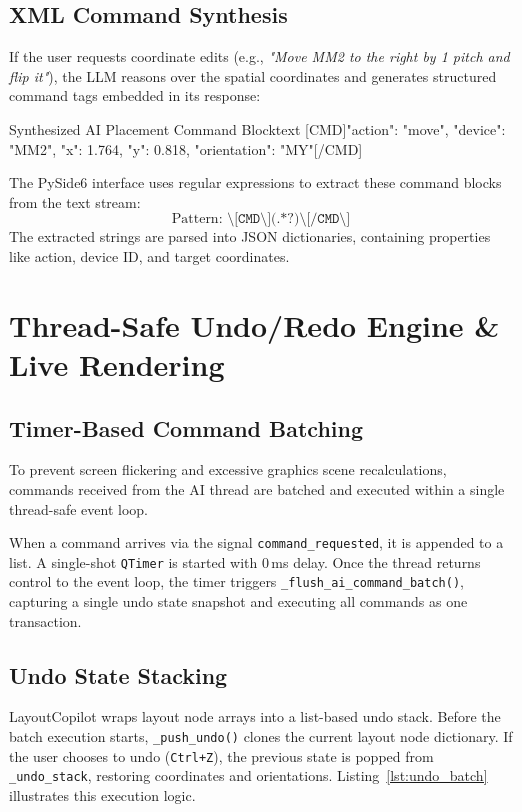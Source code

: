 \subsection{XML Command Synthesis}
If the user requests coordinate edits (e.g., \emph{"Move MM2 to the right by 1 pitch and flip it"}), the LLM reasons over the spatial coordinates and generates structured command tags embedded in its response:
\begin{thesiscode}{Synthesized AI Placement Command Block}{text}
[CMD]{"action": "move", "device": "MM2", "x": 1.764, "y": 0.818, "orientation": "MY"}[/CMD]
\end{thesiscode}

The PySide6 interface uses regular expressions to extract these command blocks from the text stream:
\begin{equation}
    \text{Pattern: } \texttt{\textbackslash[CMD\textbackslash](.*?)\textbackslash[/CMD\textbackslash]}
\end{equation}
The extracted strings are parsed into JSON dictionaries, containing properties like action, device ID, and target coordinates.

\section[Undo Stack \& Live Rendering]{Thread-Safe Undo/Redo Engine \& Live Rendering}
\label{sec:undo_klayout}

\subsection{Timer-Based Command Batching}
To prevent screen flickering and excessive graphics scene recalculations, commands received from the AI thread are batched and executed within a single thread-safe event loop. 

When a command arrives via the signal \texttt{command\_requested}, it is appended to a list. A single-shot \texttt{QTimer} is started with $0$\,ms delay. Once the thread returns control to the event loop, the timer triggers \texttt{\_flush\_}\allowbreak\texttt{ai\_}\allowbreak\texttt{command\_}\allowbreak\texttt{batch()}, capturing a single undo state snapshot and executing all commands as one transaction.

\subsection{Undo State Stacking}
LayoutCopilot wraps layout node arrays into a list-based undo stack. Before the batch execution starts, \texttt{\_push\_}\allowbreak\texttt{undo()} clones the current layout node dictionary. If the user chooses to undo (\texttt{Ctrl+Z}), the previous state is popped from \texttt{\_undo\_}\allowbreak\texttt{stack}, restoring coordinates and orientations. Listing~\ref{lst:undo_batch} illustrates this execution logic.

